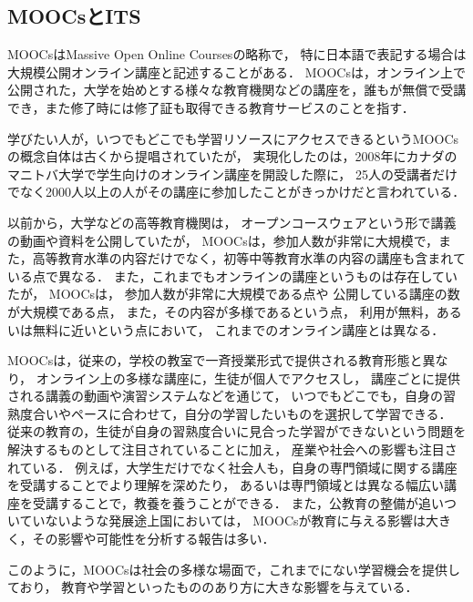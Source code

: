 \subsection{MOOCsとITS}
MOOCsはMassive Open Online Courses\cite{mcauley2010mooc, pappano2012year,siemens2013massive}の略称で，
特に日本語で表記する場合は大規模公開オンライン講座と記述することがある．
MOOCsは，オンライン上で公開された，大学を始めとする様々な教育機関などの講座を，誰もが無償で受講でき，また修了時には修了証も取得できる教育サービスのことを指す．

学びたい人が，いつでもどこでも学習リソースにアクセスできるというMOOCsの概念自体は古くから提唱されていたが，
実現化したのは，2008年にカナダのマニトバ大学で学生向けのオンライン講座を開設した際に，
25人の受講者だけでなく2000人以上の人がその講座に参加したことがきっかけだと言われている\cite{yuan2013moocs}．

以前から，大学などの高等教育機関は，
オープンコースウェア\cite{abelson2008creation}という形で講義の動画や資料を公開していたが，
MOOCsは，参加人数が非常に大規模で，また，高等教育水準の内容だけでなく，初等中等教育水準の内容の講座も含まれている点で異なる．
また，これまでもオンラインの講座というものは存在していたが，
MOOCsは，
参加人数が非常に大規模である点や
公開している講座の数が大規模である点，
また，その内容が多様であるという点，
利用が無料，あるいは無料に近いという点において，
これまでのオンライン講座とは異なる．


MOOCsは，従来の，学校の教室で一斉授業形式で提供される教育形態と異なり，
オンライン上の多様な講座に，生徒が個人でアクセスし，
講座ごとに提供される講義の動画や演習システムなどを通じて，
いつでもどこでも，自身の習熟度合いやペースに合わせて，自分の学習したいものを選択して学習できる．
従来の教育の，生徒が自身の習熟度合いに見合った学習ができないという問題を解決するものとして注目されていることに加え，
産業や社会への影響も注目されている．
例えば，大学生だけでなく社会人も，自身の専門領域に関する講座を受講することでより理解を深めたり，
あるいは専門領域とは異なる幅広い講座を受講することで，教養を養うことができる．
また，公教育の整備が追いついていないような発展途上国においては，
MOOCsが教育に与える影響は大きく，その影響や可能性を分析する報告は多い\cite{trucano2013more,liyanagunawardena2013impact}．

このように，MOOCsは社会の多様な場面で，これまでにない学習機会を提供しており，
教育や学習といったもののあり方に大きな影響を与えている．


